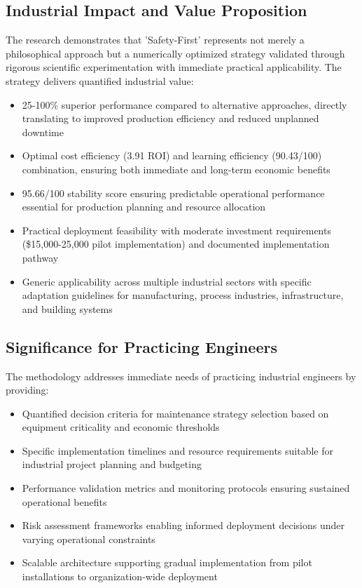 \documentclass[twocolumn]{article}
\begin{document}
\subsection{Industrial Impact and Value Proposition}

The research demonstrates that 'Safety-First' represents not merely a philosophical approach but a numerically optimized strategy validated through rigorous scientific experimentation with immediate practical applicability. The strategy delivers quantified industrial value:

\begin{itemize}
\item 25-100\% superior performance compared to alternative approaches, directly translating to improved production efficiency and reduced unplanned downtime
\item Optimal cost efficiency (3.91 ROI) and learning efficiency (90.43/100) combination, ensuring both immediate and long-term economic benefits
\item 95.66/100 stability score ensuring predictable operational performance essential for production planning and resource allocation
\item Practical deployment feasibility with moderate investment requirements (\$15,000-25,000 pilot implementation) and documented implementation pathway
\item Generic applicability across multiple industrial sectors with specific adaptation guidelines for manufacturing, process industries, infrastructure, and building systems
\end{itemize}

\subsection{Significance for Practicing Engineers}

The methodology addresses immediate needs of practicing industrial engineers by providing:

\begin{itemize}
\item Quantified decision criteria for maintenance strategy selection based on equipment criticality and economic thresholds
\item Specific implementation timelines and resource requirements suitable for industrial project planning and budgeting
\item Performance validation metrics and monitoring protocols ensuring sustained operational benefits
\item Risk assessment frameworks enabling informed deployment decisions under varying operational constraints
\item Scalable architecture supporting gradual implementation from pilot installations to organization-wide deployment
\end{itemize}
\end{document}
